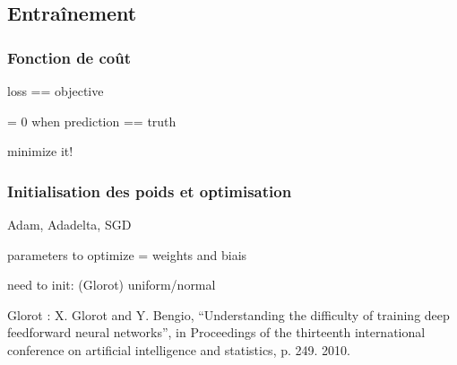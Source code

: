 \subsection{Entraînement}\label{chapter-ML-section-DNN-training}
\subsubsection{Fonction de coût}
loss == objective


= 0 when prediction == truth

minimize it!

\subsubsection{Initialisation des poids et optimisation}

Adam, Adadelta, SGD

parameters to optimize = weights and biais

need to init: (Glorot) uniform/normal

Glorot :  X. Glorot and Y. Bengio, “Understanding the difficulty of training deep feedforward neural networks”, in Proceedings of the thirteenth international conference on artificial intelligence and statistics, p. 249. 2010.



